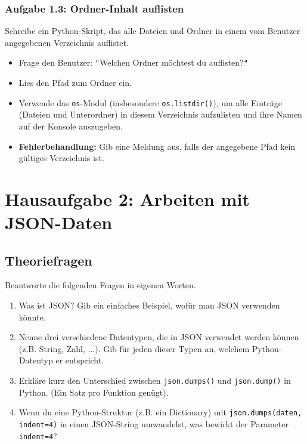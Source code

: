 \documentclass[11pt, a4paper]{article}
\begin{document}
\subsubsection*{Aufgabe 1.3: Ordner-Inhalt auflisten}
Schreibe ein Python-Skript, das alle Dateien und Ordner in einem vom Benutzer angegebenen Verzeichnis auflistet.

\begin{itemize}
    \item Frage den Benutzer: \texttt{"}Welchen Ordner möchtest du auflisten?\texttt{"}
    \item Lies den Pfad zum Ordner ein.
    \item Verwende das \texttt{os}-Modul (insbesondere \texttt{os.listdir()}), um alle Einträge (Dateien und Unterordner) in diesem Verzeichnis aufzulisten und ihre Namen auf der Konsole auszugeben.
    \item \textbf{Fehlerbehandlung:} Gib eine Meldung aus, falls der angegebene Pfad kein gültiges Verzeichnis ist.
\end{itemize}

\clearpage
\section*{Hausaufgabe 2: Arbeiten mit JSON-Daten \faFileCode}

\subsection*{Theoriefragen}
Beantworte die folgenden Fragen in eigenen Worten.

\begin{enumerate}
    \item Was ist JSON? Gib ein einfaches Beispiel, wofür man JSON verwenden könnte.
    \item Nenne drei verschiedene Datentypen, die in JSON verwendet werden können (z.B. String, Zahl, ...). Gib für jeden dieser Typen an, welchem Python-Datentyp er entspricht.
    \item Erkläre kurz den Unterschied zwischen \texttt{json.dumps()} und \texttt{json.dump()} in Python. (Ein Satz pro Funktion genügt).
    \item Wenn du eine Python-Struktur (z.B. ein Dictionary) mit \texttt{json.dumps(daten, indent=4)} in einen JSON-String umwandelst, was bewirkt der Parameter \texttt{indent=4}?
\end{enumerate}
\end{document}
